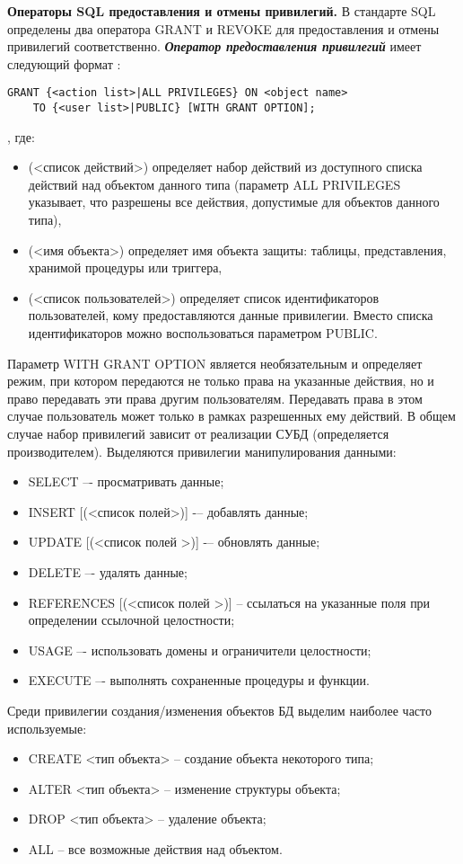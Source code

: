 {\textbf{Операторы SQL предоставления и отмены привилегий.} В стандарте SQL определены два оператора GRANT и 
REVOKE для предоставления и отмены привилегий соответственно. \textit{\textbf{Оператор предоставления привилегий}} 
имеет следующий формат \autocite{Skakun}:
\begin{lstlisting}[]
GRANT {<action list>|ALL PRIVILEGES} ON <object name>
    TO {<user list>|PUBLIC} [WITH GRANT OPTION];
\end{lstlisting}
, где:
\begin{itemize}
    \item <action list>(<список действий>) определяет набор действий из доступного списка действий над объектом 
    данного типа (параметр ALL PRIVILEGES указывает, что разрешены все действия, допустимые для объектов данного
    типа),
    \item <object name>(<имя объекта>) определяет имя объекта защиты: таблицы, представления, хранимой 
    процедуры или триггера,
    \item <user list>(<список пользователей>) определяет список идентификаторов пользователей, кому предоставляются 
    данные привилегии. Вместо списка идентификаторов можно воспользоваться параметром PUBLIC.
\end{itemize}
Параметр WITH GRANT OPTION является необязательным и определяет режим, при котором передаются не только права 
на указанные действия, но и право передавать эти права другим пользователям. Передавать права в этом случае 
пользователь может только в рамках разрешенных ему действий. В общем случае набор привилегий зависит от 
реализации СУБД (определяется производителем). Выделяются привилегии манипулирования данными:
\begin{itemize}
    \item SELECT –- просматривать данные;
    \item INSERT [(<список полей>)] -– добавлять данные;
    \item UPDATE [(<список полей >)] -– обновлять данные;
    \item DELETE –- удалять данные;
    \item REFERENCES [(<список полей >)] -- ссылаться на указанные поля при определении ссылочной целостности;
    \item USAGE –- использовать домены и ограничители целостности;
    \item EXECUTE –- выполнять сохраненные процедуры и функции.
\end{itemize}
Среди привилегии создания/изменения объектов БД выделим наиболее часто используемые:
\begin{itemize}
    \item CREATE <тип объекта> -- создание объекта некоторого типа;
    \item ALTER <тип объекта> -- изменение структуры объекта;
    \item DROP <тип объекта> -- удаление объекта;
    \item ALL -- все возможные действия над объектом.
\end{itemize}

}

